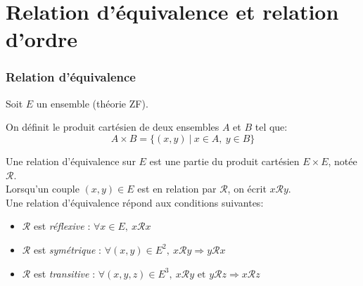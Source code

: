 \documentclass[../main.tex]{subfile}
\begin{document}
\part{Relation d'équivalence et relation d'ordre}

\section{Relation d'équivalence}
Soit $E$ un ensemble (théorie ZF).
\begin{defi}
	On définit le produit cartésien de deux ensembles $A$ et $B$ tel que:
	$$A \times B = \{ (x, y) \ | \ x \in A, \ y \in B\}$$
\end{defi}

\begin{defi}
	Une relation d'équivalence sur $E$ est une partie du produit cartésien $E \times E$, notée $\mathcal{R}$.\\
	Lorsqu'un couple $(x, y) \in E$ est en relation par $\mathcal{R}$, on écrit $x \mathcal{R} y$.\\
	Une relation d'équivalence répond aux conditions suivantes:
	\begin{itemize}
		\item $\mathcal{R}$ est \emph{réflexive} : $\forall x \in E, \ x \mathcal{R} x$
		\item $\mathcal{R}$ est \emph{symétrique} : $\forall (x, y) \in E^2, \ x \mathcal{R} y \Rightarrow y \mathcal{R} x$
		\item $\mathcal{R}$ est \emph{transitive} : $\forall (x, y, z) \in E^3, \ x \mathcal{R} y \text{ et } y \mathcal{R} z \Rightarrow x \mathcal{R} z$
	\end{itemize}
\end{defi}
\end{document}

